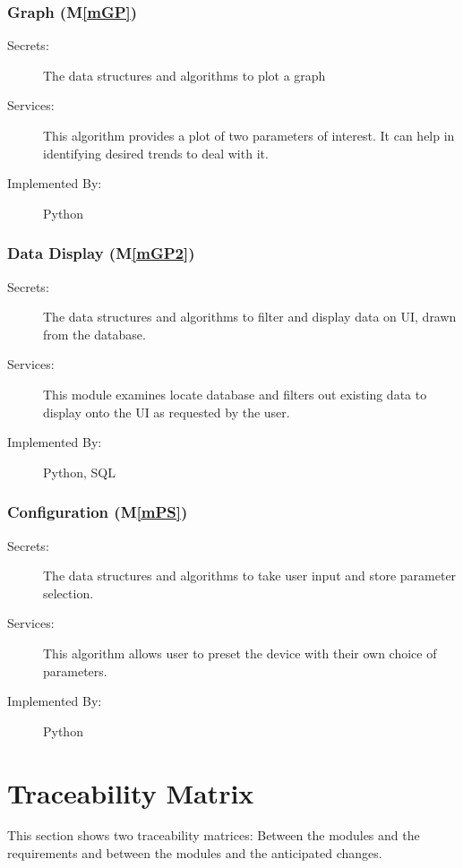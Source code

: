\documentclass[12pt, titlepage]{article}
\newcommand{\mref}[1]{M\ref{#1}}
\begin{document}
\subsubsection{Graph (\mref{mGP})}

\begin{description}
  \item[Secrets:] The data structures and algorithms to plot a graph
  \item[Services:] This algorithm provides a plot of two parameters of interest. It can help in identifying desired trends to deal with it.
  \item[Implemented By:] Python
\end{description}

\subsubsection{Data Display (\mref{mGP2})}

\begin{description}
  \item[Secrets:] The data structures and algorithms to filter and display data on UI, drawn from the database.
  \item[Services:] This module examines locate database and filters out existing data to display onto the UI as requested by the user. 
  \item[Implemented By:] Python, SQL
\end{description}

\subsubsection{Configuration (\mref{mPS})}

\begin{description}
  \item[Secrets:] The data structures and algorithms to take user input and store parameter selection.
  \item[Services:] This algorithm allows user to preset the device with their own choice of parameters.
  \item[Implemented By:] Python
\end{description}
\newpage
\section{Traceability Matrix} \label{SecTM}

This section shows two traceability matrices: Between the modules and the
requirements and between the modules and the anticipated changes.
\end{document}
